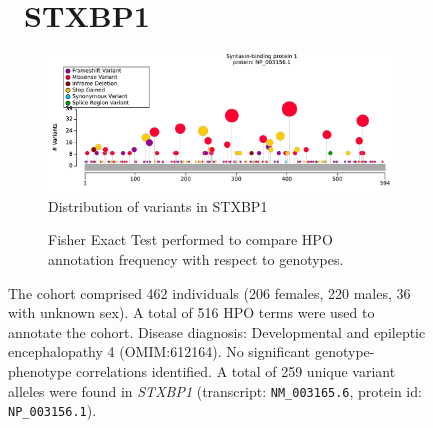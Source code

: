 \begin{figure}[htbp]
\section*{ STXBP1}
\centering
\begin{subfigure}[b]{0.95\textwidth}
\centering
\includegraphics[width=\textwidth]{ img/STXBP1_protein_diagram.pdf} 
\captionsetup{justification=raggedright,singlelinecheck=false}
\caption{Distribution of variants in STXBP1}
\end{subfigure}

\vspace{2em}

\begin{subfigure}[b]{0.95\textwidth}
\centering
{}
\captionsetup{justification=raggedright,singlelinecheck=false}
\caption{Fisher Exact Test performed to compare HPO annotation frequency with respect to genotypes. }
\end{subfigure}

\vspace{2em}

\caption{ The cohort comprised 462 individuals (206 females, 220 males, 36 with unknown sex). A total of 516 HPO terms were used to annotate the cohort. Disease diagnosis: Developmental and epileptic encephalopathy 4 (OMIM:612164). No significant genotype-phenotype correlations identified. A total of 259 unique variant alleles were found in \textit{STXBP1} (transcript: \texttt{NM\_003165.6}, protein id: \texttt{NP\_003156.1}).}
\end{figure}
